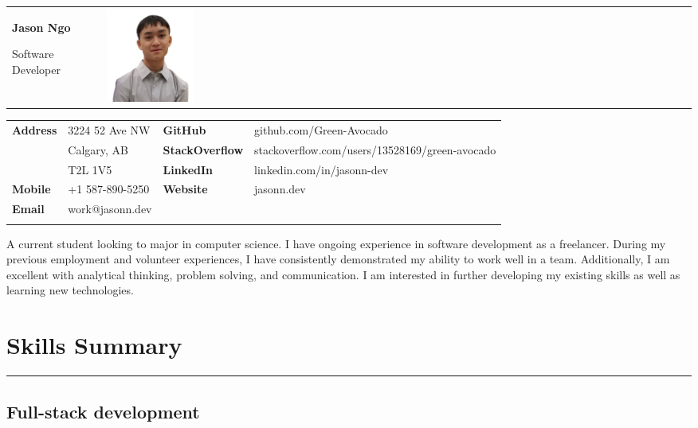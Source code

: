 \documentclass[letterpaper]{article}
\begin{document}
    \begin{tabular}{p{} >{\raggedleft\arraybackslash}m{}}
        {\Huge
        \textbf{Jason Ngo}}

        {\large
        Software Developer}
        &
        \includegraphics[width=0.15\textwidth]{../resources/pfp.png}
    \end{tabular}

    {\small%
        \renewcommand{\arraystretch}{1.5}
        \begin{tabular}{p{} p{} p{} p{}}
            \\
            \textbf{Address} & 3224 52 Ave NW & \textbf{GitHub} & github.com/Green-Avocado \\
            & Calgary, AB & \textbf{StackOverflow} & stackoverflow.com/users/13528169/green-avocado \\
            & T2L 1V5 & \textbf{LinkedIn} & linkedin.com/in/jasonn-dev \\
            \textbf{Mobile} & +1 587-890-5250 & \textbf{Website} & jasonn.dev \\
            \textbf{Email} & work@jasonn.dev \\
            \\
        \end{tabular}
    }

    A current student looking to major in computer science.
    I have ongoing experience in software development as a freelancer.
    During my previous employment and volunteer experiences, I have consistently demonstrated my ability to work well in a team.
    Additionally, I am excellent with analytical thinking, problem solving, and communication.
    I am interested in further developing my existing skills as well as learning new technologies.

    \section*{Skills Summary}

        \rule{\textwidth}{0.2pt}

        \subsection*{Full-stack development}
\end{document}

